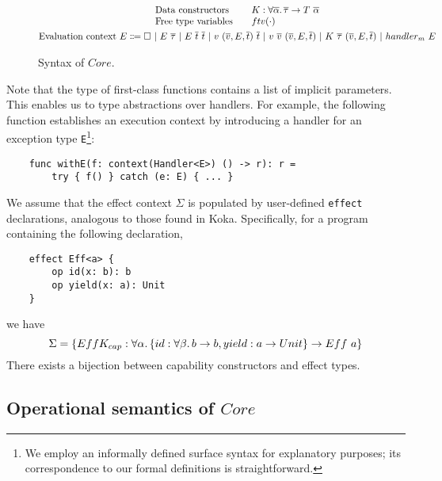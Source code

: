 \documentclass[acmsmall]{acmart}
\newcommand{\vor}{~|~}
\newcommand{\ap}{~}
\begin{document}
\begin{figure}
\begin{gather*}
\begin{array}{lrl}
            \text{Data constructors} & & K : \forall\overline{\alpha}\ldotp \overline{\tau}\to T\ap \overline{\alpha} \\
            \text{Free type variables} & & ftv(\cdot) \\
        \end{array}\\
        \begin{aligned}
            \text{Evaluation context } E \Coloneqq \square \vor E \ap \overline{\tau} \vor E \ap \overline{t}\ap \overline{t} \vor v \ap (\overline{v}, E, \overline{t}) \ap \overline{t} \vor v \ap \overline{v} \ap (\overline{v}, E, \overline{t}) \vor K\ap\overline{\tau}\ap(\overline{v}, E, \overline{t}) \vor handler_m ~ E
        \end{aligned}\\
    \end{gather*}
    \caption{Syntax of $Core$.}
    \label{fig:core-syntax}
\end{figure}

Note that the type of first-class functions contains a list of implicit parameters.
This enables us to type abstractions over handlers.
For example, the following function establishes an execution context by introducing a handler for an exception type \texttt{E}\footnote{We employ an informally defined surface syntax for explanatory purposes; its correspondence to our formal definitions is straightforward.}:
\begin{verbatim}
    func withE(f: context(Handler<E>) () -> r): r =
        try { f() } catch (e: E) { ... }
\end{verbatim}

We assume that the effect context $\Sigma$ is populated by user-defined \texttt{effect} declarations, analogous to those found in Koka. %
Specifically, for a program containing the following declaration,
\begin{verbatim}
    effect Eff<a> {
        op id(x: b): b
        op yield(x: a): Unit
    }
\end{verbatim}
we have \[\Sigma = \{EffK_{cap} : \forall\alpha\ldotp\{id : \forall\beta\ldotp b\to b, yield : a \to Unit\} \to Eff\ap a\}\]
There exists a bijection between capability constructors and effect types.

\subsection{Operational semantics of $Core$}
\end{document}
